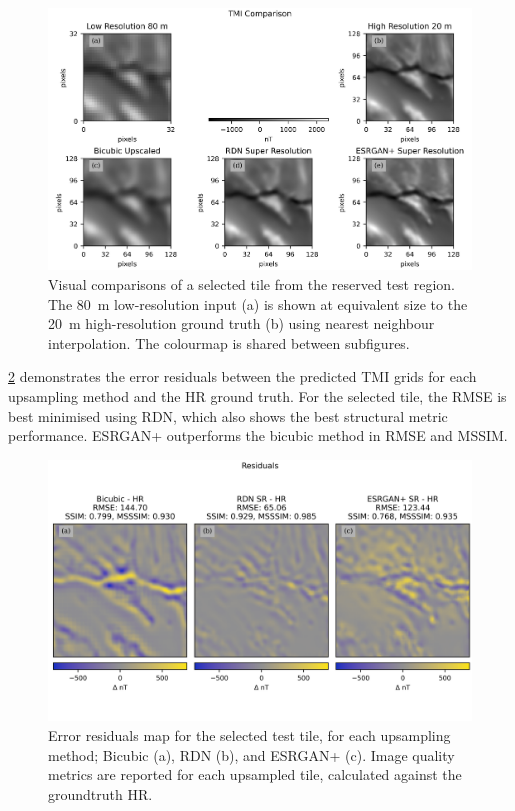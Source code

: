 \documentclass[manuscript.tex]{subfiles}
\begin{document}
\begin{figure}[hbt]
    \includegraphics[width=\textwidth]{fig/p1/image6.png}
    \caption[Visual inference results]{Visual comparisons of a selected tile from the reserved test region.
        The \SI{80}{\metre} low-resolution input (a) is shown at equivalent size to the \SI{20}{\metre} high-resolution ground truth (b) using nearest neighbour interpolation.
        The colourmap is shared between subfigures.
    }
    \label{fig:resultsvis}
\end{figure}

\cref{fig:residuals} demonstrates the error residuals between the predicted TMI grids for each upsampling method and the HR ground truth.
For the selected tile, the RMSE is best minimised using RDN\textdaggerdbl{}, which also shows the best structural metric performance.
ESRGAN+ outperforms the bicubic method in RMSE and MSSIM\@.

\begin{figure}[hbt]
    \includegraphics[width=\textwidth]{fig/p1/image7.png}
    \caption[Error residuals map for a selected tile]{Error residuals map for the selected test tile, for each upsampling method; Bicubic (a), RDN\textdaggerdbl{} (b), and ESRGAN+ (c).
        Image quality metrics are reported for each upsampled tile, calculated against the groundtruth HR\@.}
    \label{fig:residuals}
\end{figure}
\end{document}
